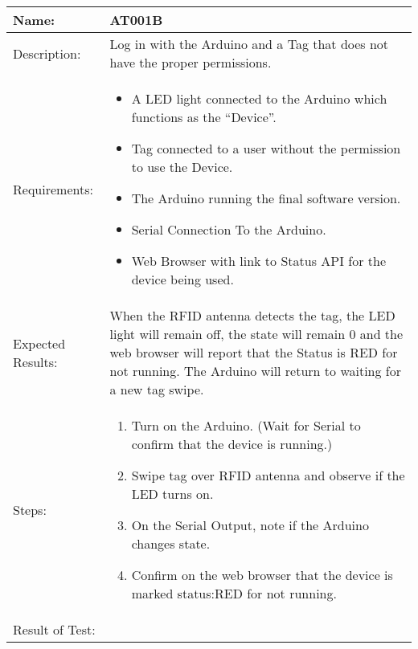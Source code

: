 \begin{table}[h]
	\centering
		\begin{tabular*}{\textwidth}{|l|l|}
		\hline
		\hline
		Name: & AT001B\\
		\hline
		Description: & Log in with the Arduino and a Tag that does not have the proper permissions.\\
		\hline
		Requirements: & \parbox{0.85\textwidth}{
		\begin{itemize}
		  \item A LED light connected to the Arduino which functions as the ``Device''.
			\item Tag connected to a user without the permission to use the Device.
			\item The Arduino running the final software version.
			\item Serial Connection To the Arduino.
			\item Web Browser with link to Status API for the device being used.
		\end{itemize}}
		\\
		\hline
		Expected Results: & \parbox{.85\textwidth}{When the RFID antenna detects the tag, the LED light will remain off, the state will remain 0 and the web browser will report that the Status is RED for not running.
		The Arduino will return to waiting for a new tag swipe.}\\
		\hline
		Steps: & \parbox{.85\textwidth}{
		\begin{enumerate}
			\item Turn on the Arduino. (Wait for Serial to confirm that the device is running.)
			\item Swipe tag over RFID antenna and observe if the LED turns on.
			\item On the Serial Output, note if the Arduino changes state.
			\item Confirm on the web browser that the device is marked status:RED for not running.
		\end{enumerate}}
		\\
		Result of Test: & \\
		\hline
		\end{tabular*}
\end{table}

